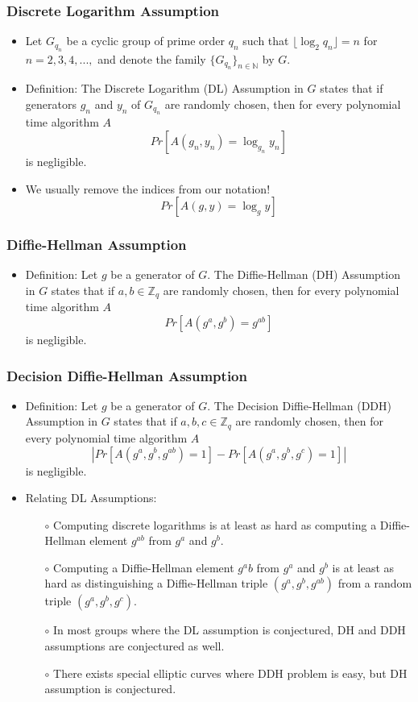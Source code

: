 \documentclass[a4paper]{scrartcl}
\begin{document}
\subsubsection*{Discrete Logarithm Assumption}

\begin{itemize}
\item Let $G_{q_n}$ be a cyclic group of prime order $q_n$ such that $\lfloor \log_2 q_n \rfloor = n$ for $n = 2,3,4,...,$ and denote the family $\{G_{q_n}\}_{n \in \mathbb{N}}$ by $G$.
\item Definition: The Discrete Logarithm (DL) Assumption in $G$ states that if generators $g_n$ and $y_n$ of $G_{q_n}$ are randomly chosen, then for every polynomial time algorithm $A$ $$Pr[A(g_n, y_n) = \log_{g_n}y_n]$$ is negligible.
\item We usually remove the indices from our notation! $$Pr[A(g,y) = \log_g y]$$
\end{itemize}

\subsubsection*{Diffie-Hellman Assumption}

\begin{itemize}
\item Definition: Let $g$ be a generator of $G$. The Diffie-Hellman (DH) Assumption in $G$ states that if $a,b \in \mathbb{Z}_q$ are randomly chosen, then for every polynomial time algorithm $A$ $$Pr[A(g^a, g^b) = g^{ab}]$$ is negligible.
\end{itemize}

\subsubsection*{Decision Diffie-Hellman Assumption}

\begin{itemize}
\item Definition: Let $g$ be a generator of $G$. The Decision Diffie-Hellman (DDH) Assumption in $G$ states that if $a,b,c \in \mathbb{Z}_q$ are randomly chosen, then for every polynomial time algorithm $A$ $$|Pr[A(g^a, g^b,g^{ab})=1] - Pr[A(g^a,g^b,g^c) = 1]|$$ is negligible.
\item Relating DL Assumptions:
\begin{itemize}
\item [$\circ$] Computing discrete logarithms is at least as hard as computing a Diffie-Hellman element $g^{ab}$ from $g^a$ and $g^b$.
\item [$\circ$] Computing a Diffie-Hellman element $g^ab$ from $g^a$ and $g^b$ is at least as hard as distinguishing a Diffie-Hellman triple $(g^a,g^b,g^{ab})$ from a random triple $(g^a,g^b,g^c)$.
\item [$\circ$] In most groups where the DL assumption is conjectured, DH and DDH assumptions are conjectured as well.
\item [$\circ$] There exists special elliptic curves where DDH problem is easy, but DH assumption is conjectured.
\end{itemize}
\end{itemize}
\end{document}
